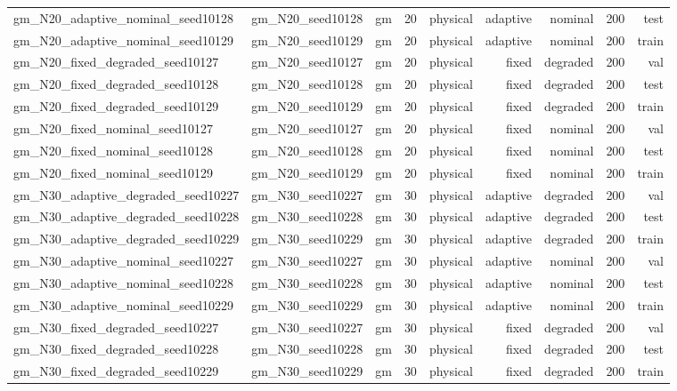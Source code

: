 \begin{tabular}{lrrrrrrrr}
gm\_N20\_adaptive\_nominal\_seed10128 & gm\_N20\_seed10128 & gm & 20 & physical & adaptive & nominal & 200 & test \\
gm\_N20\_adaptive\_nominal\_seed10129 & gm\_N20\_seed10129 & gm & 20 & physical & adaptive & nominal & 200 & train \\
gm\_N20\_fixed\_degraded\_seed10127 & gm\_N20\_seed10127 & gm & 20 & physical & fixed & degraded & 200 & val \\
gm\_N20\_fixed\_degraded\_seed10128 & gm\_N20\_seed10128 & gm & 20 & physical & fixed & degraded & 200 & test \\
gm\_N20\_fixed\_degraded\_seed10129 & gm\_N20\_seed10129 & gm & 20 & physical & fixed & degraded & 200 & train \\
gm\_N20\_fixed\_nominal\_seed10127 & gm\_N20\_seed10127 & gm & 20 & physical & fixed & nominal & 200 & val \\
gm\_N20\_fixed\_nominal\_seed10128 & gm\_N20\_seed10128 & gm & 20 & physical & fixed & nominal & 200 & test \\
gm\_N20\_fixed\_nominal\_seed10129 & gm\_N20\_seed10129 & gm & 20 & physical & fixed & nominal & 200 & train \\
gm\_N30\_adaptive\_degraded\_seed10227 & gm\_N30\_seed10227 & gm & 30 & physical & adaptive & degraded & 200 & val \\
gm\_N30\_adaptive\_degraded\_seed10228 & gm\_N30\_seed10228 & gm & 30 & physical & adaptive & degraded & 200 & test \\
gm\_N30\_adaptive\_degraded\_seed10229 & gm\_N30\_seed10229 & gm & 30 & physical & adaptive & degraded & 200 & train \\
gm\_N30\_adaptive\_nominal\_seed10227 & gm\_N30\_seed10227 & gm & 30 & physical & adaptive & nominal & 200 & val \\
gm\_N30\_adaptive\_nominal\_seed10228 & gm\_N30\_seed10228 & gm & 30 & physical & adaptive & nominal & 200 & test \\
gm\_N30\_adaptive\_nominal\_seed10229 & gm\_N30\_seed10229 & gm & 30 & physical & adaptive & nominal & 200 & train \\
gm\_N30\_fixed\_degraded\_seed10227 & gm\_N30\_seed10227 & gm & 30 & physical & fixed & degraded & 200 & val \\
gm\_N30\_fixed\_degraded\_seed10228 & gm\_N30\_seed10228 & gm & 30 & physical & fixed & degraded & 200 & test \\
gm\_N30\_fixed\_degraded\_seed10229 & gm\_N30\_seed10229 & gm & 30 & physical & fixed & degraded & 200 & train \\

\end{tabular}
